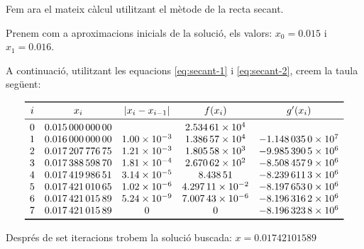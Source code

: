 \begin{exemple}
Fem ara el mateix c\`{a}lcul utilitzant el m\`{e}tode de la recta secant.

Prenem com a  aproximacions inicials de la soluci\'{o}, els valors: $x_0 = \num{0,015}$ i $x_1 = \num{0,016}$.

 A continuaci\'{o}, utilitzant les equacions \eqref{eq:secant-1} i \eqref{eq:secant-2}, creem la taula seg\"{u}ent:


    \[ \begin{array}{ccccc}
   \toprule[1pt]
        i & x_i  & |x_i - x_{i-1}| & f(x_i) & g'(x_i) \\
   \midrule
       0	&  \num{0,01500000000} & {}             & \num{2,53461E+04} & {}                   \\
       1	&  \num{0,01600000000} & \num{1,00E-03} & \num{1,38657E+04} & \num{-1,1480350E+07} \\
       2	&  \num{0,01720777675} & \num{1,21E-03} & \num{1,80558E+03} & \num{-9,9853905E+06} \\
       3	&  \num{0,01738859870} & \num{1,81E-04} & \num{2,67062E+02} & \num{-8,5084579E+06} \\
       4	&  \num{0,01741998651} & \num{3,14E-05} & \num{8,43851E+00} & \num{-8,2396113E+06} \\
       5	&  \num{0,01742101065} & \num{1,02E-06} & \num{4,29711E-02} & \num{-8,1976530E+06} \\
       6	&  \num{0,01742101589} & \num{5,24E-09} & \num{7,00743E-06} & \num{-8,1963162E+06} \\
       7	&  \num{0,01742101589} & 0              & 0                 & \num{-8,1963238E+06} \\
   \bottomrule[1pt]
   \end{array}   \]

Despr\'{e}s de set iteracions trobem la soluci\'{o} buscada: $x=\num{0,01742101589}$


\end{exemple} 